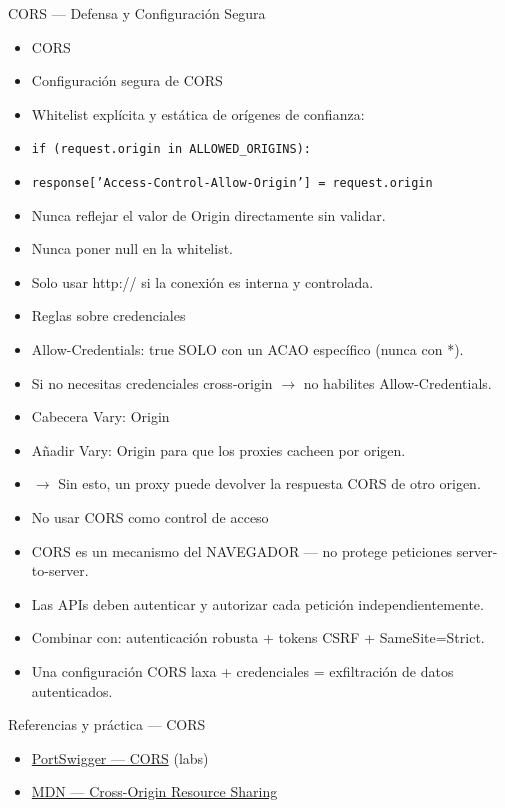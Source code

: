 \documentclass[aspectratio=169,10pt]{beamer}
\newcommand{\cmd}[1]{\texttt{\color{uznavy}#1}}
\begin{document}
\begin{frame}[allowframebreaks]{CORS --- Defensa y Configuración Segura}
\small
  \begin{itemize}
  \item CORS
  \item Configuración segura de CORS
  \item Whitelist explícita y estática de orígenes de confianza:
  \item \cmd{if (request.origin in ALLOWED\_ORIGINS):}
  \item \cmd{response['Access-Control-Allow-Origin'] = request.origin}
  \item Nunca reflejar el valor de Origin directamente sin validar.
  \item Nunca poner null en la whitelist.
  \item Solo usar http:// si la conexión es interna y controlada.
  \item Reglas sobre credenciales
  \item Allow-Credentials: true SOLO con un ACAO específico (nunca con *).
  \item Si no necesitas credenciales cross-origin $\rightarrow$ no habilites Allow-Credentials.
  \item Cabecera Vary: Origin
  \item Añadir Vary: Origin para que los proxies cacheen por origen.
  \item $\rightarrow$ Sin esto, un proxy puede devolver la respuesta CORS de otro origen.
  \item No usar CORS como control de acceso
  \item CORS es un mecanismo del NAVEGADOR --- no protege peticiones server-to-server.
  \item Las APIs deben autenticar y autorizar cada petición independientemente.
  \item Combinar con: autenticación robusta + tokens CSRF + SameSite=Strict.
  \item Una configuración CORS laxa + credenciales = exfiltración de datos autenticados.
  \end{itemize}
\end{frame}

\begin{frame}{Referencias y práctica --- CORS}
\footnotesize
  \begin{itemize}
  \item \href{https://portswigger.net/web-security/cors}{PortSwigger --- CORS} (labs)
  \item \href{https://developer.mozilla.org/en-US/docs/Web/HTTP/CORS}{MDN --- Cross-Origin Resource Sharing}
  \end{itemize}
\end{frame}
\end{document}
